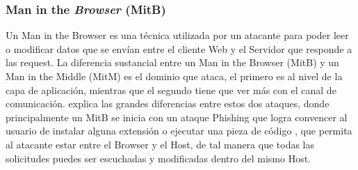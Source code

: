 	\subsubsection{Man in the \textit{Browser} (MitB)}
    Un Man in the Browser es una técnica utilizada por un atacante para poder leer o modificar datos que se envían entre el cliente Web y el Servidor que responde a las request. La diferencia sustancial entre un Man in the Browser (MitB) y un Man in the Middle (MitM) es el dominio que ataca, el primero es al nivel de la capa de aplicación, mientras que el segundo tiene que ver más con el canal de comunicación. \cite{Dougan2012} explica las grandes diferencias entre estos dos ataques, donde principalmente un MitB se inicia con un ataque Phishing que logra convencer al usuario de instalar alguna extensión o ejecutar una pieza de código \cite{Utakrit2009, Paola2006}, que permita al atacante estar entre el Browser y el Host, de tal manera que todas las solicitudes puedes ser escuchadas y modificadas dentro del mismo Host.










